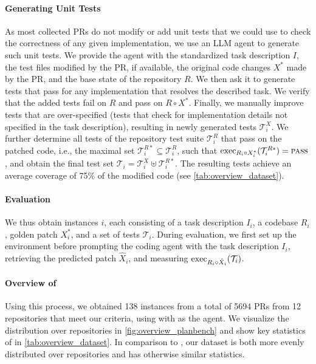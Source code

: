 \paragraph{Generating Unit Tests}
As most collected PRs do not modify or add unit tests that we could use to check the correctness of any given implementation, we use an LLM agent to generate such unit tests.
We provide the agent with the standardized task description $I$, the test files modified by the PR, if available, the original code changes $X^{*}$ made by the PR, and the base state of the repository $R$.
We then ask it to generate tests that pass for any implementation that resolves the described task. We verify that the added tests fail on $R$ and pass on $R \circ X^{*}$.
Finally, we manually improve tests that are over-specified (\ie tests that check for implementation details not specified in the task description), resulting in newly generated tests $\mathcal{T}_i^{X}$.
We further determine all tests of the repository test suite $\mathcal{T}_i^{R}$ that pass on the patched code, i.e., the maximal set $\mathcal{T}_i^{R*} \subseteq \mathcal{T}_i^{R}$, such that $\mathrm{exec}_{R_i \circ X_i^{*}}(\mathcal{T}_i^{R*}) = \textsc{pass}$, and obtain the final test set $\mathcal{T}_{i} = \mathcal{T}^{X}_{i} \uplus \mathcal{T}^{R*}_{i}$.
The resulting tests achieve an average coverage of 75\% of the modified code (see \cref{tab:overview_dataset}).

\paragraph{Evaluation}
We thus obtain \planbench{} instances $i$, each consisting of a task description $I_i$, a codebase $R_i$, golden patch $X^{*}_i$, and a set of tests $\mathcal{T}_{i}$.
During evaluation, we first set up the environment before prompting the coding agent with the task description $I_i$, retrieving the predicted patch $\hat{X}_i$, and measuring $\mathrm{exec}_{R_i \circ \hat{X}_i}(\mathcal{T}_i)$.




\paragraph{Overview of \planbench{}}
Using this process, we obtained 138 instances from a total of 5694 PRs from 12 repositories that meet our criteria, using \gptfive{} with \codex{} as the agent.
We visualize the distribution over repositories in \cref{fig:overview_planbench} and show key statistics of \planbench{} in \cref{tab:overview_dataset}. In comparison to \swebench{}, our dataset is both more evenly distributed over repositories and has otherwise similar statistics.
